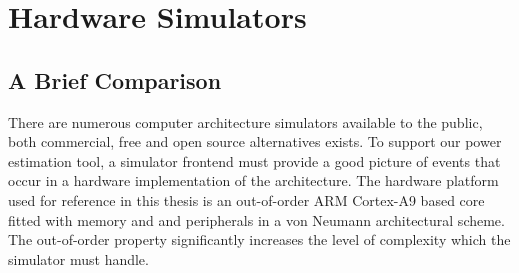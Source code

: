 \section{Hardware Simulators}

\subsection{A Brief Comparison}
\label{subsec:simulators}
There are numerous computer architecture simulators available to the public,
both commercial, free and open source alternatives exists. To support our power
estimation tool, a simulator frontend must provide a good picture of events
that occur in a hardware implementation of the architecture. The hardware
platform used for reference in this thesis is an out-of-order ARM Cortex-A9
based core fitted with memory and and peripherals in a von Neumann architectural
scheme. The out-of-order property significantly increases the level of
complexity which the simulator must handle.

